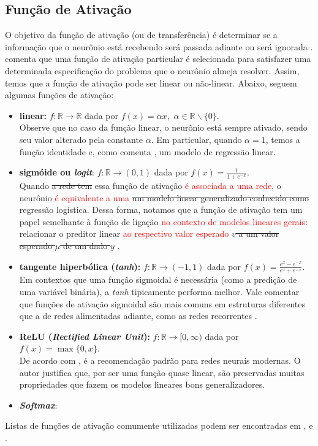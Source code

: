 \documentclass{automatextcc}
\newcommand{\pumi}[1]{\textcolor{red}{#1}}
\newcommand{\R}{\mathds{R}}
\begin{document}
\subsection{Função de Ativação}
O objetivo da função de ativação (ou de transferência) é determinar se a informação que o neurônio está recebendo será passada adiante ou será ignorada \citep{dsa2022}. \citet{hagan2014} comenta que uma função de ativação particular é selecionada para satisfazer uma determinada especificação do problema que o neurônio almeja resolver. Assim, temos que a função de ativação pode ser linear ou não-linear. Abaixo, seguem algumas funções de ativação:

\begin{itemize}
    \item \textbf{linear:} $f: \R \rightarrow \R$ dada por $f(x) = \alpha x,$  $\alpha \in \R\backslash\{0\}$. \\
    Observe que no caso da função linear, o neurônio está sempre ativado, sendo seu valor alterado pela constante $\alpha$. Em particular, quando $\alpha=1$, temos a função identidade e, como comenta \citet{sarle1994}, um modelo de regressão linear.
    \item \textbf{sigmóide ou \textit{logit}}: $f: \R \rightarrow (0,1)$ dada por $f(x) = \frac{1}{1 + e^{-x}}$. \\
    Quando \sout{a rede tem} essa função de ativação \pumi{é associada a uma rede}, o neurônio \pumi{é equivalente a uma} \sout{um modelo linear generalizado conhecido como} regressão logística. Dessa forma, notamos que a função de ativação tem um papel semelhante à função de ligação \pumi{no contexto de modelos lineares gerais}: relacionar o preditor linear \pumi{ao respectivo valor esperado} \sout{$v$ a um valor esperado $\mu$ de um dado $y$} \citep{sarle1994,frei2020,mccullagh1989}. %
    \item \textbf{tangente hiperbólica (\textit{tanh}):}  $f:\R \rightarrow (-1,1)$ dada por $f(x) = \frac{e^{x}-e^{-x}}{e^{x}+e^{-x}}$. \\
    Em contextos que uma função sigmoidal é necessária (como a predição de uma variável binária), a \textit{tanh} tipicamente performa melhor. Vale comentar que funções de ativação sigmoidal são mais comuns em estruturas diferentes que a de redes alimentadas adiante, como as redes recorrentes \citep{goodfellow2016}.  
    \item \textbf{ReLU (\textit{Rectified Linear Unit}):} $f: \R \rightarrow [0,\infty)$ dada por $f(x) = \max\{0,x\}$. \\
    De acordo com \citet{goodfellow2016}, é a recomendação padrão para redes neurais modernas. O autor justifica que, por ser uma função quase linear, são preservadas muitas propriedades que fazem os modelos lineares bons generalizadores. %
    \item \textbf{\textit{Softmax}}:
\end{itemize}
Listas de funções de ativação comumente utilizadas podem ser encontradas em \citet{hagan2014}, \citet{aggarwal2018} e \citet{dsa2022}.
\end{document}
